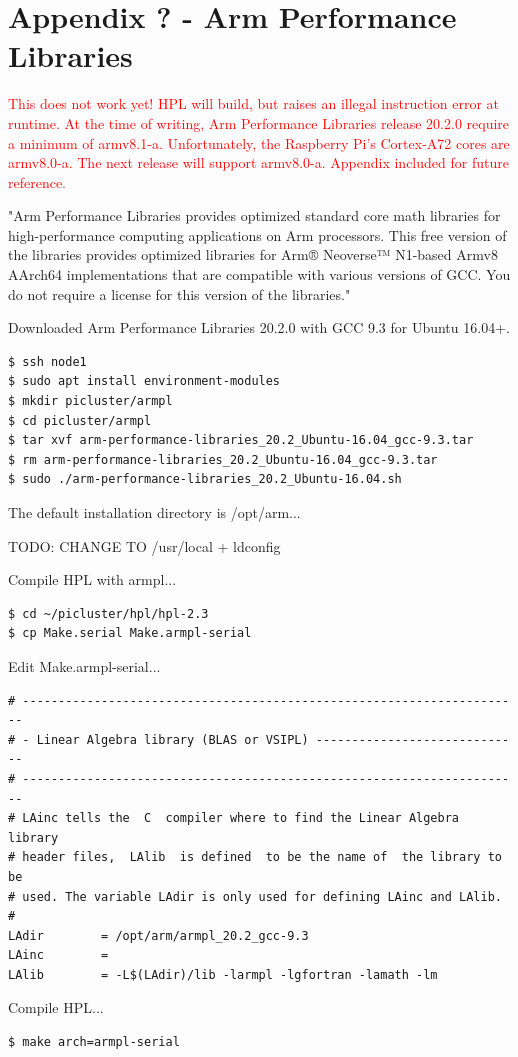 \documentclass{article}
\begin{document}
%
%

\clearpage\section*{Appendix ? - Arm Performance Libraries}

\textcolor{red}{This does not work yet! HPL will build, but raises an illegal instruction error at runtime. At the time of writing, Arm Performance Libraries release 20.2.0 require a minimum of armv8.1-a. Unfortunately, the Raspberry Pi's Cortex-A72 cores are armv8.0-a. The next release will support armv8.0-a. Appendix included for future reference.}  

"Arm Performance Libraries provides optimized standard core math libraries for high-performance computing applications on Arm processors. This free version of the libraries provides optimized libraries for Arm® Neoverse™ N1-based Armv8 AArch64 implementations that are compatible with various versions of GCC. You do not require a license for this version of the libraries."

Downloaded Arm Performance Libraries 20.2.0 with GCC 9.3 for Ubuntu 16.04+.

\lstset{style=termstyle}
\begin{lstlisting}
$ ssh node1
$ sudo apt install environment-modules
$ mkdir picluster/armpl
$ cd picluster/armpl
$ tar xvf arm-performance-libraries_20.2_Ubuntu-16.04_gcc-9.3.tar
$ rm arm-performance-libraries_20.2_Ubuntu-16.04_gcc-9.3.tar
$ sudo ./arm-performance-libraries_20.2_Ubuntu-16.04.sh
\end{lstlisting}

The default installation directory is /opt/arm...

TODO: CHANGE TO /usr/local + ldconfig

Compile HPL with armpl...

\lstset{style=termstyle}
\begin{lstlisting}
$ cd ~/picluster/hpl/hpl-2.3
$ cp Make.serial Make.armpl-serial
\end{lstlisting}

Edit Make.armpl-serial...

\lstset{style=listingstyle}
\begin{lstlisting}[caption=Make.armpl-serial extract]
# ----------------------------------------------------------------------
# - Linear Algebra library (BLAS or VSIPL) -----------------------------
# ----------------------------------------------------------------------
# LAinc tells the  C  compiler where to find the Linear Algebra  library
# header files,  LAlib  is defined  to be the name of  the library to be 
# used. The variable LAdir is only used for defining LAinc and LAlib.
#
LAdir        = /opt/arm/armpl_20.2_gcc-9.3
LAinc        =
LAlib        = -L$(LAdir)/lib -larmpl -lgfortran -lamath -lm
\end{lstlisting}

Compile HPL...

\lstset{style=termstyle}
\begin{lstlisting}[]
$ make arch=armpl-serial
\end{lstlisting}



%
%
\end{document}

